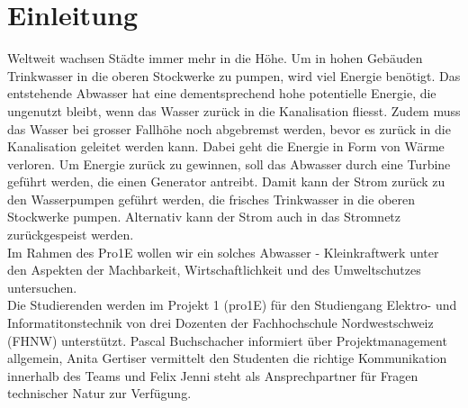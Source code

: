 \section{Einleitung}
Weltweit wachsen Städte immer mehr in die Höhe. Um in hohen Gebäuden Trinkwasser in die oberen Stockwerke zu pumpen, wird viel Energie benötigt. Das entstehende Abwasser hat eine dementsprechend hohe potentielle Energie, die ungenutzt bleibt, wenn das Wasser zurück in die Kanalisation fliesst. Zudem muss das Wasser bei grosser Fallhöhe noch abgebremst werden, bevor es zurück in die Kanalisation geleitet werden kann. Dabei geht die Energie in Form von Wärme verloren.
Um Energie zurück zu gewinnen, soll das Abwasser durch eine Turbine geführt werden, die einen Generator antreibt. Damit kann der Strom zurück zu den Wasserpumpen geführt werden, die frisches Trinkwasser in die oberen Stockwerke pumpen. Alternativ kann der Strom auch in das Stromnetz zurückgespeist werden.\\
Im Rahmen des Pro1E wollen wir ein solches Abwasser - Kleinkraftwerk unter den Aspekten der Machbarkeit, Wirtschaftlichkeit und des Umweltschutzes untersuchen.\\
Die Studierenden werden im Projekt 1 (pro1E) für den Studiengang Elektro- und Informatitonstechnik von drei Dozenten der Fachhochschule Nordwestschweiz (FHNW) unterstützt. Pascal Buchschacher informiert über Projektmanagement allgemein, Anita Gertiser vermittelt den Studenten die richtige Kommunikation innerhalb des Teams und Felix Jenni steht als Ansprechpartner für Fragen technischer Natur zur Verfügung.





